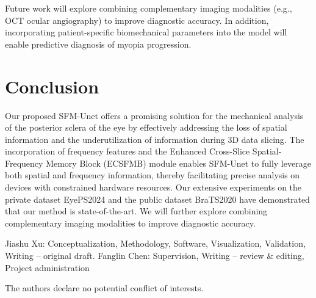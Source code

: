 \documentclass[AMA,Times1COL]{WileyNJDv5} %
\begin{document}
Future work will explore combining complementary imaging modalities (e.g., OCT ocular angiography) to improve diagnostic accuracy. In addition, incorporating patient-specific biomechanical parameters into the model will enable predictive diagnosis of myopia progression.

\section{Conclusion}
Our proposed SFM-Unet offers a promising solution for the mechanical analysis of the posterior sclera of the eye by effectively addressing the loss of spatial information and the underutilization of information during 3D data slicing. The incorporation of frequency features and the Enhanced Cross-Slice Spatial-Frequency Memory Block (ECSFMB) module enables SFM-Unet to fully leverage both spatial and frequency information, thereby facilitating precise analysis on devices with constrained hardware resources. Our extensive experiments on the private dataset EyePS2024 and the public dataset BraTS2020 have demonstrated that our method is state-of-the-art. We will further explore combining complementary imaging modalities to improve diagnostic accuracy. %



{}
Jiashu Xu: Conceptualization, Methodology, Software, Visualization, Validation, Writing – original draft. Fanglin Chen: Supervision, Writing – review \& editing, Project administration

The authors declare no potential conflict of interests.

% 








\end{document}
